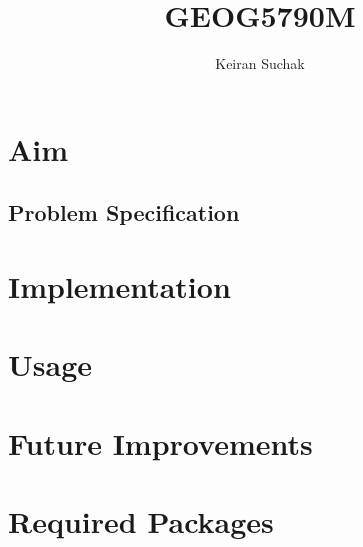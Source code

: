 \documentclass[a4paper, 12pt, twoside]{article}
\begin{document}
\title{GEOG5790M}
\author{Keiran Suchak}

\maketitle
\tableofcontents

\section{Aim}\label{sec:aim}

\subsection{Problem Specification}\label{sub:aim:problem}

\section{Implementation}\label{sec:implementation}

\section{Usage}\label{sec:usage}

\section{Future Improvements}\label{sec:improvements}

\newpage
\appendix
\section{Required Packages}\label{sec:requirements}
\end{document}
